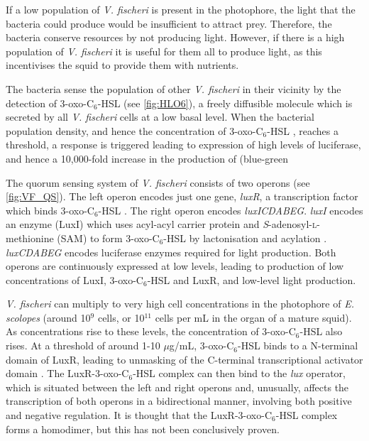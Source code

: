 If a low population  of \textit{V. fischeri} is  present  in  the  photophore,  the  light  that the bacteria could produce would  be insufficient to  attract prey. Therefore, the bacteria conserve resources by not producing light.
However, if there is a high population of \textit{V. fischeri} it is useful for them all to produce light, as this incentivises the squid to provide them with nutrients. 


The bacteria sense the population of other \textit{V. fischeri} in their vicinity by the detection of 3-oxo-C$_6$-HSL \cite{Eberhard1981} (see \ref{fig:HLO6}), a freely diffusible\cite{Kaplan1985} molecule which is secreted by all \textit{V. fischeri} cells\cite{Schaefer1996} at a low basal level\cite{Miller2001}. When the bacterial population density, and hence the concentration of 3-oxo-C$_6$-HSL , reaches a threshold, a response is triggered leading to expression of high levels of luciferase, and hence a 10,000-fold\cite{Devine1989} increase in the production of (blue-green%

The quorum sensing system of \textit{V. fischeri} consists of two operons (see \ref{fig:VF_QS}). The left operon encodes just one gene, \textit{luxR}, a transcription factor which binds 3-oxo-C$_6$-HSL . The right operon encodes \textit{luxICDABEG}. \textit{luxI} encodes an enzyme (LuxI) which uses acyl-acyl carrier protein and \textit{S}-adenosyl-\textsc{l}-methionine (SAM) to form 3-oxo-C$_6$-HSL  by lactonisation and acylation \cite{Parsek1999, Watson2002}. \textit {luxCDABEG} encodes luciferase enzymes required for light production. Both operons are continuously expressed at low levels, leading to production of low concentrations of LuxI, 3-oxo-C$_6$-HSL  and LuxR, and low-level light production\cite{Engebrecht1983}. 

\textit{V. fischeri} can multiply to very high cell concentrations in the photophore of \textit{E. scolopes} (around 10$^9$ cells\cite{Ruby1993, Ruby1998, Nyholm1998}, or 10$^{11}$ cells per mL \cite{Miller2001} in the organ of a mature squid). As concentrations rise to these levels, the concentration of 3-oxo-C$_6$-HSL  also rises. At a threshold of around 1-10 $\mu$g/mL\cite{Eberhard1981}, 3-oxo-C$_6$-HSL  binds to a N-terminal domain of LuxR\cite{Hanzelka1995}, leading to unmasking of the C-terminal transcriptional activator domain \cite{Choi1991,Choi1992}. The LuxR-3-oxo-C$_6$-HSL complex can then bind to the \textit{lux} operator, which is situated between the left and right operons and, unusually, affects the transcription of both operons in a bidirectional manner, involving both positive and negative regulation\cite{Shadel1991}. It is thought that the LuxR-3-oxo-C$_6$-HSL complex forms a homodimer\cite{Choi1992a}, but this has not been conclusively proven\cite{Antunes2008,Miyashiro2012}.

